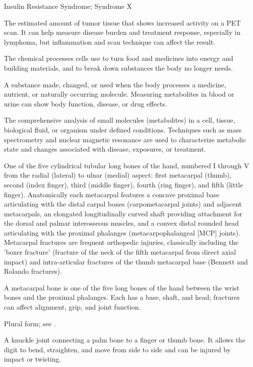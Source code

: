 \synonyms
Insulin Resistance Syndrome; Syndrome X

 The estimated amount of tumor tissue that shows increased activity on a PET scan. It can help measure disease burden and treatment response, especially in lymphoma, but inflammation and scan technique can affect the result.

 The chemical processes cells use to turn food and medicines into energy and building materials, and to break down substances the body no longer needs.

 A substance made, changed, or used when the body processes a medicine, nutrient, or naturally occurring molecule. Measuring metabolites in blood or urine can show body function, disease, or drug effects.

 The comprehensive analysis of small molecules (metabolites) in a cell, tissue, biological fluid, or organism under defined conditions. Techniques such as mass spectrometry and nuclear magnetic resonance are used to characterize metabolic state and changes associated with disease, exposures, or treatment.

 One of the five cylindrical tubular long bones of the hand, numbered I through V from the radial (lateral) to ulnar (medial) aspect: first metacarpal (thumb), second (index finger), third (middle finger), fourth (ring finger), and fifth (little finger). Anatomically each metacarpal features a concave proximal base articulating with the distal carpal bones (carpometacarpal joints) and adjacent metacarpals, an elongated longitudinally curved shaft providing attachment for the dorsal and palmar interosseous muscles, and a convex distal rounded head articulating with the proximal phalanges (metacarpophalangeal [MCP] joints). Metacarpal fractures are frequent orthopedic injuries, classically including the 'boxer fracture' (fracture of the neck of the fifth metacarpal from direct axial impact) and intra-articular fractures of the thumb metacarpal base (Bennett and Rolando fractures).

 A metacarpal bone is one of the five long bones of the hand between the wrist bones and the proximal phalanges. Each has a base, shaft, and head; fractures can affect alignment, grip, and joint function.

 Plural form; see .

 A knuckle joint connecting a palm bone to a finger or thumb bone. It allows the digit to bend, straighten, and move from side to side and can be injured by impact or twisting.

